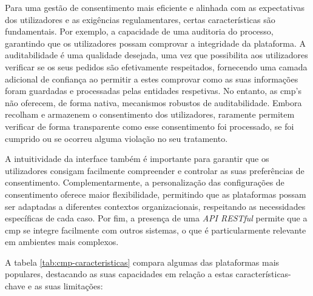 Para uma gestão de consentimento mais eficiente e alinhada com as expectativas dos utilizadores e as exigências regulamentares, certas características são fundamentais.
Por exemplo, a capacidade de uma auditoria do processo, garantindo que os utilizadores possam comprovar a integridade da plataforma.
A auditabilidade é uma qualidade desejada, uma vez que possibilita aos utilizadores verificar se os seus pedidos são efetivamente respeitados, fornecendo uma camada adicional de confiança ao permitir a estes comprovar como as suas informações foram guardadas e processadas pelas entidades respetivas.
No entanto, as \acrshort{cmp}'s não oferecem, de forma nativa, mecanismos robustos de auditabilidade. Embora recolham e armazenem o consentimento dos utilizadores, raramente permitem verificar de forma transparente como esse consentimento foi processado, se foi cumprido ou se ocorreu alguma violação no seu tratamento.

A intuitividade da interface também é importante para garantir que os utilizadores consigam facilmente compreender e controlar as suas preferências de consentimento.
Complementarmente, a personalização das configurações de consentimento oferece maior flexibilidade, permitindo que as plataformas possam ser adaptadas a diferentes contextos organizacionais, respeitando as necessidades específicas de cada caso.
Por fim, a presença de uma \textit{API RESTful} permite que a \acrshort{cmp} se integre facilmente com outros sistemas, o que é particularmente relevante em ambientes mais complexos.

A tabela \ref{tab:cmp-caracteristicas} compara algumas das plataformas mais populares, destacando as suas capacidades em relação a estas características-chave e as suas limitações:

